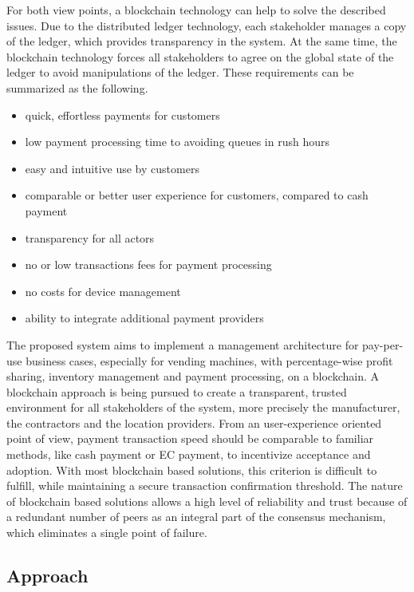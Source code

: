 For both view points, a blockchain technology can help to solve the described issues. Due to the distributed ledger technology, each stakeholder manages a copy of the ledger, which provides transparency in the system. At the same time, the blockchain technology forces all stakeholders to agree on the global state of the ledger to avoid manipulations of the ledger. These requirements can be summarized as the following. \\
\begin{itemize}
  \item quick, effortless payments for customers
  \item low payment processing time to avoiding queues in rush hours
  \item easy and intuitive use by customers
  \item comparable or better user experience for customers, compared to cash payment
  \item transparency for all actors
  \item no or low transactions fees for payment processing
  \item no costs for device management
  \item ability to integrate additional payment providers
\end{itemize}
The proposed system aims to implement a management architecture for pay-per-use business cases, especially for vending machines, with percentage-wise profit sharing, inventory management and payment processing, on a blockchain. A blockchain approach is being pursued to create a transparent, trusted environment for all stakeholders of the system, more precisely the manufacturer, the contractors and the location providers. From an user-experience oriented point of view, payment transaction speed should be comparable to familiar methods, like cash payment or EC payment, to incentivize acceptance and adoption. With most blockchain based solutions, this criterion is difficult to fulfill, while maintaining a secure transaction confirmation threshold. The nature of blockchain based solutions allows a high level of reliability and trust because of a redundant number of peers as an integral part of the consensus mechanism, which eliminates a single point of failure.

\subsection{Approach}

